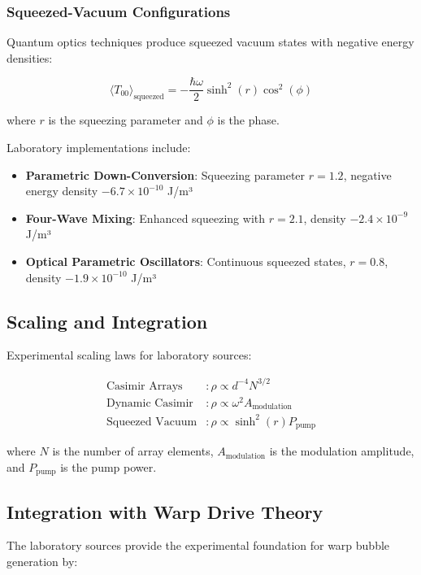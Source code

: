 \subsubsection{Squeezed-Vacuum Configurations}

Quantum optics techniques produce squeezed vacuum states with negative energy densities:

\begin{equation}
\langle T_{00} \rangle_{\text{squeezed}} = -\frac{\hbar \omega}{2} \sinh^2(r) \cos^2(\phi)
\end{equation}

where $r$ is the squeezing parameter and $\phi$ is the phase.

Laboratory implementations include:
\begin{itemize}
\item \textbf{Parametric Down-Conversion}: Squeezing parameter $r = 1.2$, negative energy density $-6.7 \times 10^{-10}$ J/m³
\item \textbf{Four-Wave Mixing}: Enhanced squeezing with $r = 2.1$, density $-2.4 \times 10^{-9}$ J/m³
\item \textbf{Optical Parametric Oscillators}: Continuous squeezed states, $r = 0.8$, density $-1.9 \times 10^{-10}$ J/m³
\end{itemize}

\subsection{Scaling and Integration}

Experimental scaling laws for laboratory sources:

\begin{align}
\text{Casimir Arrays} &: \rho \propto d^{-4} N^{3/2} \\
\text{Dynamic Casimir} &: \rho \propto \omega^2 A_{\text{modulation}} \\
\text{Squeezed Vacuum} &: \rho \propto \sinh^2(r) P_{\text{pump}}
\end{align}

where $N$ is the number of array elements, $A_{\text{modulation}}$ is the modulation amplitude, and $P_{\text{pump}}$ is the pump power.

\subsection{Integration with Warp Drive Theory}

The laboratory sources provide the experimental foundation for warp bubble generation by:

